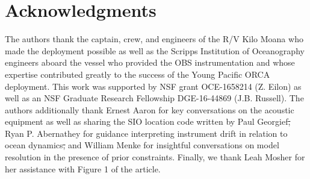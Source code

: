 \documentclass[10pt,titlepage]{article}
\providecommand{\DIFaddtex}[1]{{\protect\color{blue}\uwave{#1}}} %
\providecommand{\DIFdeltex}[1]{{\protect\color{red}\sout{#1}}}                      %
\providecommand{\DIFaddbegin}{} %
\providecommand{\DIFaddend}{} %
\providecommand{\DIFdelbegin}{} %
\providecommand{\DIFdelend}{} %
\providecommand{\DIFadd}[1]{\texorpdfstring{\DIFaddtex{#1}}{#1}} %
\providecommand{\DIFdel}[1]{\texorpdfstring{\DIFdeltex{#1}}{}} %
\begin{document}
\section{Acknowledgments }
The authors thank the captain, crew, and engineers of the R/V Kilo Moana who made the deployment possible as well as the Scripps Institution of Oceanography engineers aboard the vessel who provided the OBS instrumentation and whose expertise contributed greatly to the success of the Young Pacific ORCA deployment. This work was supported by NSF grant OCE-1658214 (Z. Eilon) as well as an NSF Graduate Research Fellowship DGE-16-44869 (J.B. Russell). The authors additionally thank Ernest Aaron for key conversations on the acoustic equipment as well as sharing the SIO location code written by Paul Georgief\DIFdelbegin \DIFdel{, }\DIFdelend \DIFaddbegin \DIFadd{; }\DIFaddend Ryan P. Abernathey for guidance interpreting instrument drift in relation to ocean dynamics\DIFdelbegin \DIFdel{, }\DIFdelend \DIFaddbegin \DIFadd{; }\DIFaddend and William Menke for insightful conversations on model resolution in the presence of prior constraints. Finally, we thank Leah Mosher for her assistance with Figure 1 of the article.
\end{document}
